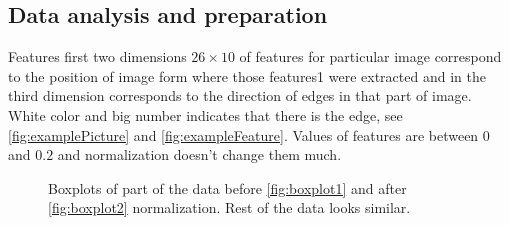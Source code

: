 \documentclass[]{article}
\begin{document}
\subsection{Data analysis and preparation}
  Features first two dimensions $26\times10$ of features for particular image correspond to the position of image form where those features1 were extracted and in the third dimension corresponds to the direction of edges in that part of image. White color and big number indicates that there is the edge, see \ref{fig:examplePicture} and \ref{fig:exampleFeature}. Values of features are between $0$ and $0.2$ and normalization doesn't change them much. 
  \begin{figure}[!h]
  \center
  \;
  \caption{Boxplots of part of the data before \ref{fig:boxplot1} and after \ref{fig:boxplot2} normalization. Rest of the data looks similar.}
\end{figure}
  
\end{document}
